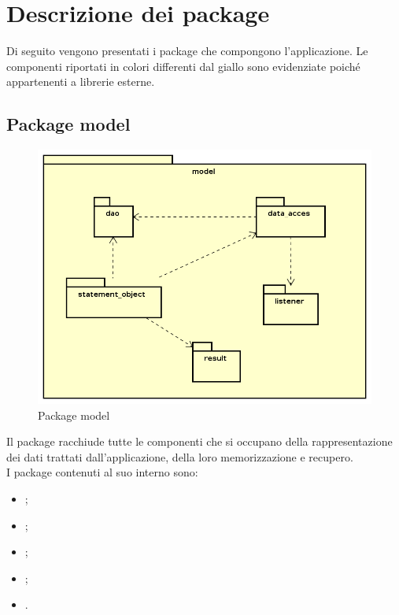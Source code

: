 \documentclass[../Tesi.tex]{subfiles}
\begin{document}
\section{Descrizione dei package}
Di seguito vengono presentati i package che compongono l'applicazione. Le componenti riportati in colori differenti dal giallo sono evidenziate poiché appartenenti a librerie esterne.

	\subsection{Package model}
		\begin{figure}[H]
			\centering
			\includegraphics[scale=0.6]{images/package_diagrams/model}
				\caption{Package model}
			\label{fig:StrutturaMVP}
		\end{figure}
		Il package  racchiude tutte le componenti che si occupano della rappresentazione dei dati trattati dall'applicazione, della loro memorizzazione e recupero. \\
		I package contenuti al suo interno sono:
		\begin{itemize}
			\item {};
			\item {};
			\item {};
			\item {};
			\item {}.
		\end{itemize}
\end{document}
